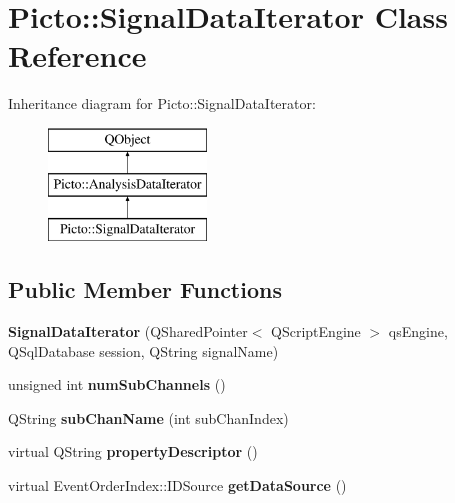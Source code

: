 \hypertarget{class_picto_1_1_signal_data_iterator}{\section{Picto\-:\-:Signal\-Data\-Iterator Class Reference}
\label{class_picto_1_1_signal_data_iterator}
}
Inheritance diagram for Picto\-:\-:Signal\-Data\-Iterator\-:\begin{figure}[H]
\begin{center}
\leavevmode
\includegraphics[height=3.000000cm]{class_picto_1_1_signal_data_iterator}
\end{center}
\end{figure}
\subsection*{Public Member Functions}
\begin{DoxyCompactItemize}
\item 
\hypertarget{class_picto_1_1_signal_data_iterator_a0467e841ac685cebc6e226ddf5211177}{{\bfseries Signal\-Data\-Iterator} (Q\-Shared\-Pointer$<$ Q\-Script\-Engine $>$ qs\-Engine, Q\-Sql\-Database session, Q\-String signal\-Name)}\label{class_picto_1_1_signal_data_iterator_a0467e841ac685cebc6e226ddf5211177}

\item 
\hypertarget{class_picto_1_1_signal_data_iterator_a8fe648660b1fc6fa2983c47fd3e518a7}{unsigned int {\bfseries num\-Sub\-Channels} ()}\label{class_picto_1_1_signal_data_iterator_a8fe648660b1fc6fa2983c47fd3e518a7}

\item 
\hypertarget{class_picto_1_1_signal_data_iterator_a3190899185e441fe5797edf2087e8e56}{Q\-String {\bfseries sub\-Chan\-Name} (int sub\-Chan\-Index)}\label{class_picto_1_1_signal_data_iterator_a3190899185e441fe5797edf2087e8e56}

\item 
\hypertarget{class_picto_1_1_signal_data_iterator_a375e1e7076662dece66399bf7159485c}{virtual Q\-String {\bfseries property\-Descriptor} ()}\label{class_picto_1_1_signal_data_iterator_a375e1e7076662dece66399bf7159485c}

\item 
\hypertarget{class_picto_1_1_signal_data_iterator_a198f92622a554303f84101d21615792e}{virtual Event\-Order\-Index\-::\-I\-D\-Source {\bfseries get\-Data\-Source} ()}\label{class_picto_1_1_signal_data_iterator_a198f92622a554303f84101d21615792e}

\end{DoxyCompactItemize}
